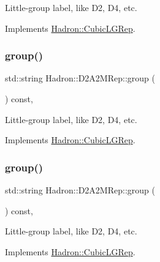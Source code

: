 Little-\/group label, like D2, D4, etc. 

Implements \mbox{\hyperlink{structHadron_1_1CubicLGRep_a9bdb14b519a611d21379ed96a3a9eb41}{Hadron\+::\+Cubic\+L\+G\+Rep}}.

\mbox{\label{structHadron_1_1D2A2MRep_a93c34b277f64808d5863a7b292bbb888}} 
\subsubsection{\texorpdfstring{group()}{group()}\hspace{0.1cm}{\footnotesize\ttfamily [2/3]}}
{\footnotesize\ttfamily std\+::string Hadron\+::\+D2\+A2\+M\+Rep\+::group (\begin{DoxyParamCaption}{ }\end{DoxyParamCaption}) const\hspace{0.3cm}{\ttfamily [inline]}, {\ttfamily [virtual]}}

Little-\/group label, like D2, D4, etc. 

Implements \mbox{\hyperlink{structHadron_1_1CubicLGRep_a9bdb14b519a611d21379ed96a3a9eb41}{Hadron\+::\+Cubic\+L\+G\+Rep}}.

\mbox{\label{structHadron_1_1D2A2MRep_a93c34b277f64808d5863a7b292bbb888}} 
\subsubsection{\texorpdfstring{group()}{group()}\hspace{0.1cm}{\footnotesize\ttfamily [3/3]}}
{\footnotesize\ttfamily std\+::string Hadron\+::\+D2\+A2\+M\+Rep\+::group (\begin{DoxyParamCaption}{ }\end{DoxyParamCaption}) const\hspace{0.3cm}{\ttfamily [inline]}, {\ttfamily [virtual]}}

Little-\/group label, like D2, D4, etc. 

Implements \mbox{\hyperlink{structHadron_1_1CubicLGRep_a9bdb14b519a611d21379ed96a3a9eb41}{Hadron\+::\+Cubic\+L\+G\+Rep}}.

\mbox{\label{structHadron_1_1D2A2MRep_af770f75006ed187caad6a1bf3df3e64e}} 
